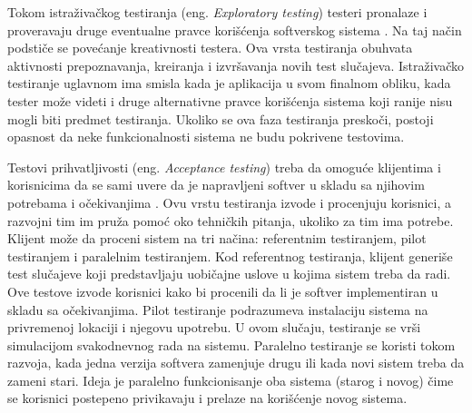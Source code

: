 \documentclass[12pt,oneside]{memoir}
\begin{document}
Tokom istraživačkog testiranja (eng. \textit{Exploratory testing}) testeri pronalaze i proveravaju druge eventualne pravce korišćenja softverskog sistema \cite{ExploratoryTesting}. Na taj način podstiče se povećanje kreativnosti testera. Ova vrsta testiranja obuhvata aktivnosti prepoznavanja, kreiranja i izvršavanja novih test slučajeva. Istraživačko testiranje uglavnom ima smisla kada je aplikacija u svom finalnom obliku, kada tester može videti i druge alternativne pravce korišćenja sistema koji ranije nisu mogli biti predmet testiranja. Ukoliko se ova faza testiranja preskoči, postoji opasnost da neke funkcionalnosti sistema ne budu pokrivene testovima.
\par 


Testovi prihvatljivosti (eng. \textit{Acceptance testing}) 
treba da omoguće klijentima i korisnicima da se sami uvere da je napravljeni softver u skladu sa njihovim potrebama i očekivanjima \cite{AcceptanceTesting}.
Ovu vrstu testiranja izvode i procenjuju korisnici, a razvojni tim im pruža pomoć oko tehničkih pitanja, ukoliko za tim ima potrebe.
Klijent može da proceni sistem na tri načina: referentnim testiranjem, pilot testiranjem i paralelnim testiranjem. Kod referentnog testiranja, klijent generiše test slučajeve koji predstavljaju uobičajne uslove u kojima sistem treba da radi. Ove testove izvode korisnici kako bi procenili da li je softver implementiran u skladu sa očekivanjima. Pilot testiranje podrazumeva instalaciju sistema na privremenoj lokaciji i njegovu upotrebu. U ovom slučaju, testiranje se vrši simulacijom svakodnevnog rada na sistemu.
Paralelno testiranje se koristi tokom razvoja, kada jedna verzija softvera zamenjuje drugu ili kada novi sistem treba da zameni stari. 
Ideja je paralelno funkcionisanje oba sistema (starog i novog) čime se korisnici postepeno privikavaju i prelaze na korišćenje novog sistema.
\par 
\end{document}
